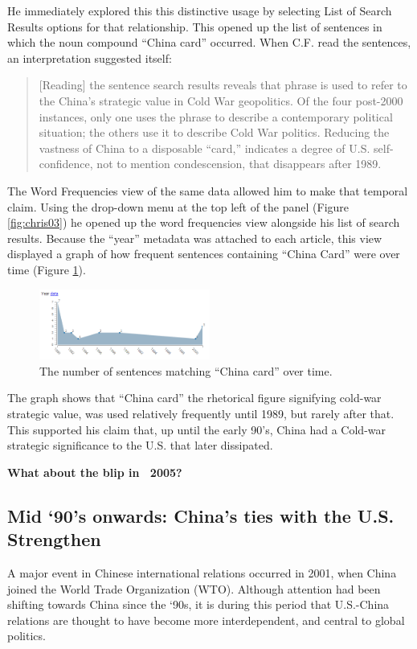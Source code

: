 \documentclass{sig-alternate}
\newcommand{\strong}[1] {\textbf{#1}}
\begin{document}
He immediately explored this this distinctive usage by selecting List of Search Results options for that relationship.  This opened up the list of sentences in which the noun compound ``China card'' occurred.  When C.F. read the sentences, an interpretation suggested itself:
\begin{quote}
[Reading] the sentence search results reveals that phrase is used to refer to the China's strategic value in Cold War geopolitics. Of the four post-2000 instances, only one uses the phrase to describe a contemporary political situation; the others use it to describe Cold War politics. Reducing the vastness of China to a disposable ``card,'' indicates a degree of U.S. self-confidence, not to mention condescension, that disappears after 1989.
\end{quote}

The Word Frequencies view of the same data allowed him to make that temporal claim. Using the drop-down menu at the top left of the panel (Figure \ref{fig:chris03}) he opened up the word frequencies view alongside his list of search results.  Because the ``year'' metadata was attached to each article, this view displayed a graph of how frequent  sentences containing ``China Card'' were over time (Figure \ref{fig:chris02}). 
\begin{figure}[h!]
\includegraphics[width=0.5\textwidth]{fig/chris/02.png}
\caption{ The number of sentences matching ``China card'' over time. \label{fig:chris02}}
\end{figure}
The graph shows that ``China card'' the rhetorical figure signifying cold-war strategic value, was used relatively frequently until 1989, but rarely  after that. This supported his claim that, up until the early 90's, China had a Cold-war strategic significance to the U.S. that later dissipated.

\strong{What about the blip in ~2005?}

\subsection{Mid `90's onwards: China's ties with the U.S. Strengthen}

A major event in Chinese international relations occurred in 2001, when China joined the World Trade Organization (WTO).  Although attention had been shifting towards China since the `90s, it is during this period that U.S.-China relations are thought to have become more interdependent, and central to global politics. 
\end{document}
